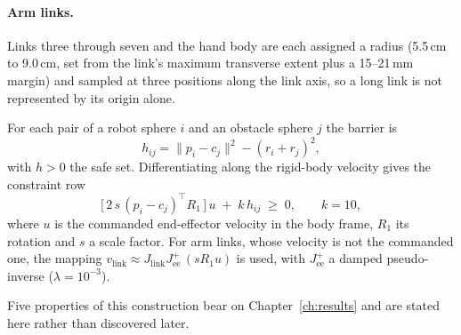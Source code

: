 \paragraph{Arm links.} Links three through seven and the hand body are each assigned a radius
(5.5\,cm to 9.0\,cm, set from the link's maximum transverse extent plus a 15--21\,mm margin) and
sampled at three positions along the link axis, so a long link is not represented by its origin
alone.

For each pair of a robot sphere $i$ and an obstacle sphere $j$ the barrier is
\begin{equation}
  h_{ij} = \lVert p_i - c_j \rVert^{2} - (r_i + r_j)^{2},
  \label{eq:barrier}
\end{equation}
with $h > 0$ the safe set. Differentiating along the rigid-body velocity gives the constraint row
\begin{equation}
  \bigl[\, 2\,s\,(p_i - c_j)^{\top} R_1 \,\bigr]\, u \;+\; k\,h_{ij} \;\ge\; 0,
  \qquad k = 10,
  \label{eq:constraint_row}
\end{equation}
where $u$ is the commanded end-effector velocity in the body frame, $R_1$ its rotation and $s$ a
scale factor. For arm links, whose velocity is not the commanded one, the mapping
$v_{\mathrm{link}} \approx J_{\mathrm{link}} J_{\mathrm{ee}}^{+}\,(s R_1 u)$ is used, with
$J_{\mathrm{ee}}^{+}$ a damped pseudo-inverse ($\lambda = 10^{-3}$).

Five properties of this construction bear on Chapter~\ref{ch:results} and are stated here rather
than discovered later.

